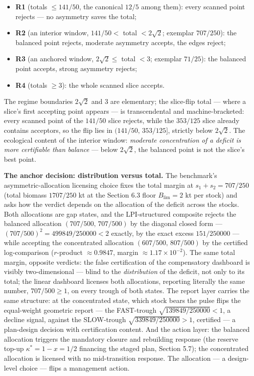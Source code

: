 \documentclass[3p,11pt]{elsarticle}
\providecommand{\tightlist}{\setlength{\itemsep}{0pt}\setlength{\parskip}{0pt}}
\begin{document}
\begin{itemize}
\tightlist
\item
  \textbf{R1} (totals \(\le 141/50\), the canonical \(12/5\)
  among them): every scanned point rejects --- no asymmetry saves
  the total;
\item
  \textbf{R2} (an interior window, \(141/50 <\) total \(<
  2\sqrt{2}\); exemplar \(707/250\)): the balanced point rejects,
  moderate asymmetry accepts, the edges reject;
\item
  \textbf{R3} (an anchored window, \(2\sqrt{2} \le\) total
  \(< 3\); exemplar \(71/25\)): the balanced point accepts, strong
  asymmetry rejects;
\item
  \textbf{R4} (totals \(\ge 3\)): the whole scanned slice
  accepts.
\end{itemize}

The regime boundaries \(2\sqrt{2}\) and \(3\) are elementary;
the slice-flip total --- where a slice's first accepting point
appears --- is transcendental and machine-bracketed: every
scanned point of the \(141/50\) slice rejects, while the
\(353/125\) slice already contains acceptors, so the flip lies
in \((141/50,\, 353/125]\), strictly below \(2\sqrt{2}\). The
ecological content of the interior window: \emph{moderate
concentration of a deficit is more certifiable than balance} ---
below \(2\sqrt{2}\), the balanced point is not the slice's best
point.

\textbf{The anchor decision: distribution versus total.} The
benchmark's asymmetric-allocation licensing choice fixes the
total margin at \(s_1 + s_2 = 707/250\) (total biomass
\(1707/250\) kt at the Section 6.3 floor \(B_{\mathrm{lim}} = 2\)
kt per stock) and asks how the verdict depends on the allocation
of the deficit across the stocks. Both allocations are gap
states, and the LPI-structured composite rejects the balanced
allocation \((707/500,\, 707/500)\) by the diagonal closed form
--- \((707/500)^2 = 499849/250000 < 2\) exactly, by the exact
excess \(151/250000\) --- while accepting the concentrated
allocation \((607/500,\, 807/500)\) by the certified
log-comparison (\(r\)-product \(\approx 0.9847\), margin
\(\approx 1.17 \times 10^{-2}\)). The same total margin, opposite
verdicts: the false certification of the compensatory dashboard
is visibly two-dimensional --- blind to the \emph{distribution}
of the deficit, not only to its total; the linear dashboard
licenses both allocations, reporting literally the same number,
\(707/500 \ge 1\), on every trough of both states. The report
layer carries the same structure: at the concentrated state,
which stock bears the pulse flips the equal-weight geometric
report --- the FAST-trough \(\sqrt{139849/250000} < 1\), a
decline signal, against the SLOW-trough \(\sqrt{339849/250000}
> 1\), certified --- a plan-design decision with certification
content. And the action layer: the balanced allocation triggers
the mandatory closure and rebuilding response (the reserve top-up
\(\kappa^* = 1 - x = 1/2\) financing the staged plan,
Section 5.7); the concentrated allocation is licensed with no
mid-transition response. The allocation --- a design-level
choice --- flips a management action.
\end{document}
